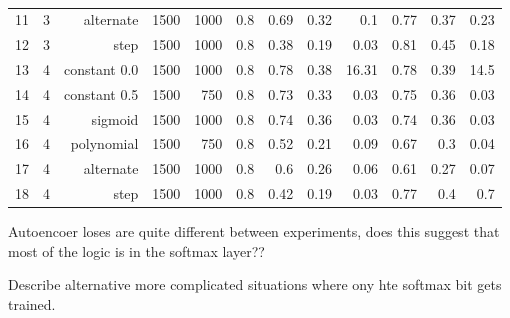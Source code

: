 \begin{table}[!h]
{\begin{tabular}{rrrrrrrrrrrr}
    			11  & 3       & alternate  & 1500       & 1000            & 0.8 & 0.69  & 0.32 & 0.1    & 0.77  & 0.37 & 0.23   \\
          12 & 3 & step     & 1500 &  1000 &  0.8 &    0.38 &   0.19 &     0.03 &    0.81 &   0.45 &     0.18 \\
    			\hline
          13  & 4       & constant 0.0   & 1500       &  1000           & 0.8  &    0.78 &   0.38 &    16.31 &    0.78 &   0.39 &    14.5 \\
    			14 & 4       & constant 0.5   & 1500       & 750             & 0.8 & 0.73  & 0.33 & 0.03   & 0.75  & 0.36 & 0.03   \\
    			15 & 4       & sigmoid    & 1500       & 1000            & 0.8 & 0.74  & 0.36 & 0.03   & 0.74  & 0.36 & 0.03   \\
    			16 & 4       & polynomial & 1500       & 750             & 0.8 & 0.52  & 0.21 & 0.09   & 0.67  & 0.3  & 0.04   \\
    			17 & 4       & alternate  & 1500       & 1000            & 0.8 & 0.6   & 0.26 & 0.06   & 0.61  & 0.27 & 0.07   \\
          18 & 4       & step       & 1500       &  1000           & 0.8  &    0.42 &   0.19 &     0.03 &    0.77 &   0.4  &     0.7 \\


    			\hline
    		\end{tabular}  } \caption{} \label{tab:pseaafasfrch} \end{table}

        Autoencoer loses are quite different between experiments, does this suggest that
        most of the logic is in the softmax layer??

        Describe alternative more complicated situations where ony hte softmax bit gets trained.


    \newpage

    \newpage
